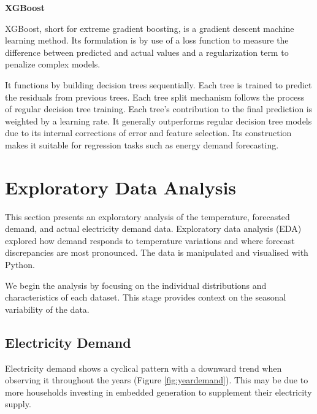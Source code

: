 \documentclass[mstat,12pt]{unswthesis}
\begin{document}
\bigskip

\noindent \textbf{XGBoost}

\bigskip

\noindent XGBoost, short for extreme gradient boosting, is a gradient descent machine learning method. Its formulation is by use of a loss function to measure the difference between predicted and actual values and a regularization term to penalize complex models.

\bigskip

It functions by building decision trees sequentially. Each tree is trained to predict the residuals from previous trees. Each tree split mechanism follows the process of regular decision tree training. Each tree's contribution to the final prediction is weighted by a learning rate. It generally outperforms regular decision tree models due to its internal corrections of error and feature selection. Its construction makes it suitable for regression tasks such as energy demand forecasting.

\chapter{Exploratory Data Analysis}\label{exploratory-data-analysis}

This section presents an exploratory analysis of the temperature, forecasted demand, and actual electricity demand data. Exploratory data analysis (EDA) explored how demand responds to temperature variations and where forecast discrepancies are most pronounced. The data is manipulated and visualised with Python.

\bigskip

We begin the analysis by focusing on the individual distributions and characteristics of each dataset. This stage provides context on the seasonal variability of the data.

\section{Electricity Demand}\label{electricity-demand}

Electricity demand shows a cyclical pattern with a downward trend when observing it throughout the years (Figure \ref{fig:yeardemand}). This may be due to more households investing in embedded generation to supplement their electricity supply.
\end{document}
